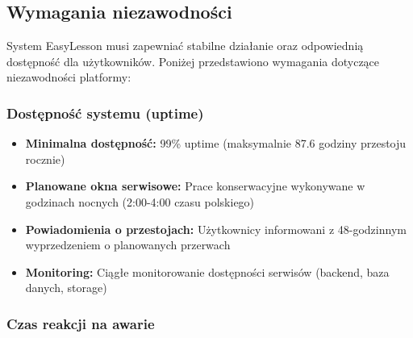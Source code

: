 \documentclass[12pt,a4paper]{article}
\begin{document}
\subsection{Wymagania niezawodności}

System EasyLesson musi zapewniać stabilne działanie oraz odpowiednią dostępność dla użytkowników. Poniżej przedstawiono wymagania dotyczące niezawodności platformy:

\subsubsection{Dostępność systemu (uptime)}

\begin{itemize}[leftmargin=*]
    \item \textbf{Minimalna dostępność:} 99\% uptime (maksymalnie 87.6 godziny przestoju rocznie)
    \item \textbf{Planowane okna serwisowe:} Prace konserwacyjne wykonywane w godzinach nocnych (2:00-4:00 czasu polskiego)
    \item \textbf{Powiadomienia o przestojach:} Użytkownicy informowani z 48-godzinnym wyprzedzeniem o planowanych przerwach
    \item \textbf{Monitoring:} Ciągłe monitorowanie dostępności serwisów (backend, baza danych, storage)
\end{itemize}

\subsubsection{Czas reakcji na awarie}
\end{document}
